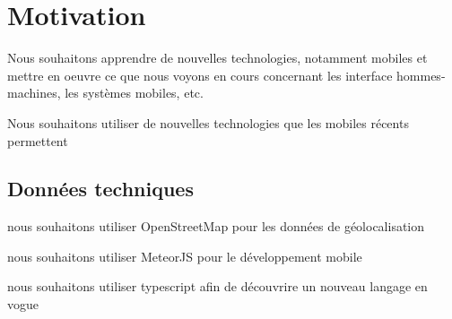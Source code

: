 \section{Motivation}

Nous souhaitons apprendre de nouvelles technologies, notamment mobiles et mettre en oeuvre ce que nous voyons en cours concernant les interface hommes-machines, les systèmes mobiles, etc.

Nous souhaitons utiliser de nouvelles technologies que les mobiles récents permettent


\subsection{Données techniques}
\item nous souhaitons utiliser OpenStreetMap pour les données de géolocalisation
\item nous souhaitons utiliser MeteorJS pour le développement mobile
\item nous souhaitons utiliser typescript afin de découvrire un nouveau langage en vogue


